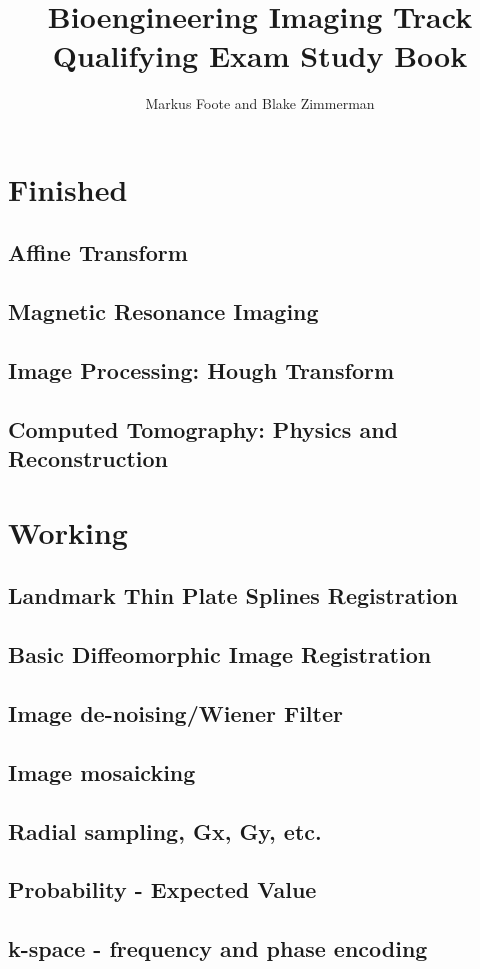 \documentclass{report}
\title{Bioengineering Imaging Track Qualifying Exam Study Book}
\author{Markus Foote and Blake Zimmerman}
\begin{document}
	\maketitle
	\setcounter{tocdepth}{1} %
	\tableofcontents
	\part{Finished}
	\chapter{Affine Transform}
	
	
	\chapter{Magnetic Resonance Imaging}
	
	
	\chapter{Image Processing: Hough Transform}
	
	
	\chapter{Computed Tomography: Physics and Reconstruction}
	
	\part{Working}
	\chapter{Landmark Thin Plate Splines Registration}
	\chapter{Basic Diffeomorphic Image Registration}
	
	\chapter{Image de-noising/Wiener Filter}
	
	\chapter{Image mosaicking}
	
	\chapter{Radial sampling, Gx, Gy, etc.}
	
	\chapter{Probability - Expected Value}
	
	\chapter{k-space - frequency and phase encoding}
	
	
	
	
	
	
		
\end{document}
